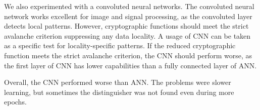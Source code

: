 \documentclass[
  print, %
  Table,   %
  nolof,     %
  nolot,     %
  11pt, %
  oneside  %
]{fithesis3}
\begin{document}
We also experimented with a convoluted neural networks. The convoluted neural network works excellent for image and signal processing, as the convoluted layer detects local patterns. However, cryptographic functions should meet the strict avalanche criterion suppressing any data locality. A usage of CNN can be taken as a specific test for locality-specific patterns. If the reduced cryptographic function meets the strict avalanche criterion, the CNN should perform worse, as the first layer of CNN has lower capabilities than a fully connected layer of ANN.

Overall, the CNN performed worse than ANN. The problems were slower learning, but sometimes the distinguisher was not found even during more epochs.





\end{document}
